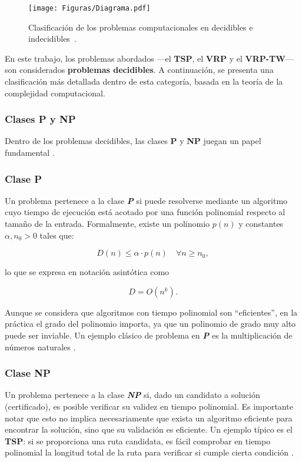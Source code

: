 \documentclass[12pt,titlepage,twoside,openright]{book}
\begin{document}
\begin{figure}[H]
	\centering
	\texttt{[image: Figuras/Diagrama.pdf]}
	\caption{Clasificación de los problemas computacionales en decidibles e indecidibles~\citep{maldonado2013problema}.}
	\label{fig:decidibilidad}
\end{figure}

En este trabajo, los problemas abordados —el \textbf{TSP}, el \textbf{VRP} y el \textbf{VRP-TW}— son considerados \textbf{problemas decidibles}. A continuación, se presenta una clasificación más detallada dentro de esta categoría, basada en la teoría de la complejidad computacional.


\subsubsection{Clases P y NP}

Dentro de los problemas decidibles, las clases \textbf{P} y \textbf{NP} juegan un papel fundamental \citep{maldonado2013problema}.

\subsubsection*{Clase P}
Un problema pertenece a la clase \emph{\textbf{P}} si puede resolverse mediante un algoritmo cuyo tiempo de ejecución está acotado por una función polinomial respecto al tamaño de la entrada. Formalmente, existe un polinomio \(p(n)\) y constantes \(\alpha, n_0 > 0\) tales que:

\[
	D(n) \leq \alpha \cdot p(n) \quad \forall n \geq n_0,
\]

lo que se expresa en notación asintótica como

\[
	D = O(n^k).
\]

Aunque se considera que algoritmos con tiempo polinomial son “eficientes”, en la práctica el grado del polinomio importa, ya que un polinomio de grado muy alto puede ser inviable. Un ejemplo clásico de problema en \emph{\textbf{P}} es la multiplicación de números naturales \citep{Flores2014}.

\subsubsection*{Clase NP}
	\label{subsec: clase_np}
Un problema pertenece a la clase \emph{\textbf{NP}} si, dado un candidato a solución (certificado), es posible verificar su validez en tiempo polinomial. Es importante notar que esto no implica necesariamente que exista un algoritmo eficiente para encontrar la solución, sino que su validación es eficiente. Un ejemplo típico es el \textbf{TSP}: si se proporciona una ruta candidata, es fácil comprobar en tiempo polinomial la longitud total de la ruta para verificar si cumple cierta condición \citep{Flores2014}.
\end{document}
